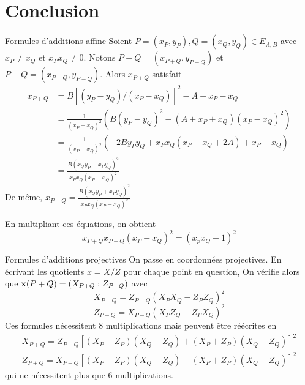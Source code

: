 \documentclass{beamer}
\begin{document}
\section*{Conclusion}
\begin{frame}
\end{frame}

\begin{frame}{Formules d'additions affine}\small
	Soient $P=(x_P,y_P), Q=(x_Q,y_Q) \in E_{A,B}$ avec $x_P \neq x_Q$ et $x_P x_Q \neq 0$.
	Notons $P+Q=(x_{P+Q},y_{P+Q})$ et $P-Q=(x_{P-Q},y_{P-Q})$. Alors $x_{P+Q}$ satisfait
	\[\begin{aligned}
		x_{P+Q}	&= B[(y_P - y_Q)/(x_P-x_Q)]^2 - A - x_P - x_Q \\
		&= \frac{1}{(x_P-x_Q)^2}( B(y_P - y_Q)^2 - (A + x_P + x_Q)(x_P - x_Q)^2) \\
		&= \frac{1}{(x_P-x_Q)^2}( -2B y_P y_Q + x_P x_Q (x_P + x_Q + 2A) + x_P + x_Q) \\
		&= \frac{B(x_Q y_P - x_P y_Q)^2}{x_P x_Q (x_P-x_Q)^2}
	\end{aligned}\]
	De même, $x_{P-Q} = \frac{B(x_Q y_P + x_P y_Q)^2}{x_P x_Q (x_P-x_Q)^2}$
	
	En multipliant ces équations, on obtient
	\[x_{P+Q} x_{P-Q} (x_P - x_Q)^2 = (x_p x_Q -1)^2\]
\end{frame}

\begin{frame}{Formules d'additions projectives}\small
	On passe en coordonnées projectives. En écrivant les quotients $x=X/Z$ pour chaque point en question,
	On vérifie alors que $\textbf{x}(P+Q)=(X_{P+Q}:Z_{P+Q})$ avec \[X_{P+Q} = Z_{P-Q}(X_P X_Q - Z_P Z_Q)^2\]\[Z_{P+Q} = X_{P-Q}(X_P Z_Q - Z_P X_Q)^2\]
	Ces formules nécessitent 8 multiplications mais peuvent être réécrites en
	\[\begin{array}{l}
		X_{P+Q} = Z_{P-Q}[(X_P-Z_P)(X_Q+Z_Q) + (X_P+Z_P)(X_Q-Z_Q)]^2\\
		Z_{P+Q} = X_{P-Q}[(X_P-Z_P)(X_Q+Z_Q) - (X_P+Z_P)(X_Q-Z_Q)]^2
	\end{array}\]
	qui ne nécessitent plus que 6 multiplications.
\end{frame}
\end{document}
